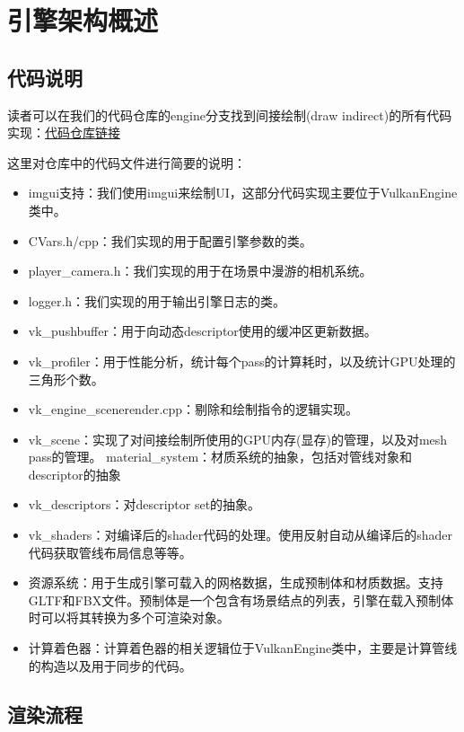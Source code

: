 \documentclass{ctexart}
\begin{document}
\section{引擎架构概述}

\subsection{代码说明}

读者可以在我们的代码仓库的engine分支找到间接绘制(draw indirect)的所有代码实现：\href{https://github.com/vblanco20-1/vulkan-guide/tree/engine}{代码仓库链接}

这里对仓库中的代码文件进行简要的说明：

\begin{itemize}
	\item imgui支持：我们使用imgui来绘制UI，这部分代码实现主要位于VulkanEngine类中。
	\item CVars.h/cpp：我们实现的用于配置引擎参数的类。
	\item player\_camera.h：我们实现的用于在场景中漫游的相机系统。
	\item logger.h：我们实现的用于输出引擎日志的类。
	\item vk\_pushbuffer：用于向动态descriptor使用的缓冲区更新数据。
	\item vk\_profiler：用于性能分析，统计每个pass的计算耗时，以及统计GPU处理的三角形个数。
	\item vk\_engine\_scenerender.cpp：剔除和绘制指令的逻辑实现。
	\item vk\_scene：实现了对间接绘制所使用的GPU内存(显存)的管理，以及对mesh pass的管理。
	material\_system：材质系统的抽象，包括对管线对象和descriptor的抽象
	\item vk\_descriptors：对descriptor set的抽象。
	\item vk\_shaders：对编译后的shader代码的处理。使用反射自动从编译后的shader代码获取管线布局信息等等。
	\item 资源系统：用于生成引擎可载入的网格数据，生成预制体和材质数据。支持GLTF和FBX文件。预制体是一个包含有场景结点的列表，引擎在载入预制体时可以将其转换为多个可渲染对象。
	\item 计算着色器：计算着色器的相关逻辑位于VulkanEngine类中，主要是计算管线的构造以及用于同步的代码。
\end{itemize}

\subsection{渲染流程}
\end{document}
